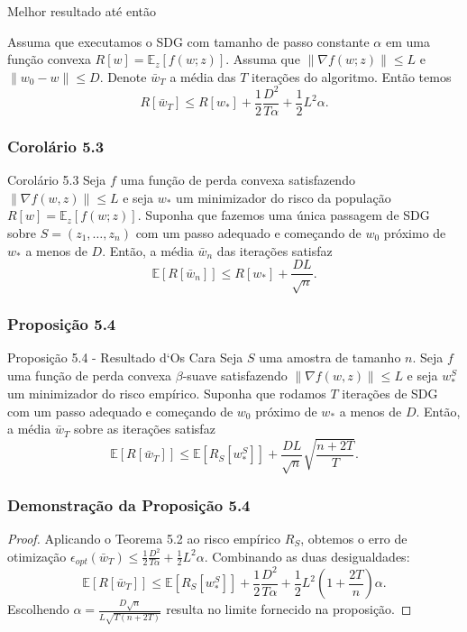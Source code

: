 \documentclass{beamer}
\newcommand{\EE}{\mathbb{E}}
\begin{document}
\begin{frame}{Melhor resultado até então}
\begin{theorem}
Assuma que executamos o SDG com tamanho de passo constante \(\alpha\) em uma função convexa \(R[w]=\EE_z[f(w;z)]\).
Assuma que $\|\nabla f(w;z)\|\le L$ e $\|w_0 - w\| \le D$. Denote $\bar{w}_T$ a média das $T$ iterações do algoritmo.
Então temos
$$ R[\bar{w}_T] \le R[w_*] + \frac{1}{2}\frac{D^2}{T\alpha} + \frac{1}{2}L^2\alpha. $$ 
\end{theorem}
\end{frame}

\begin{frame}
\frametitle{Corolário 5.3}
\begin{block}{Corolário 5.3}
Seja $f$ uma função de perda convexa satisfazendo \(\|\nabla f(w,z)\| \le L\) e seja \(w_*\) um minimizador do risco da população \(R[w] = \EE_z[ f(w;z)]\). Suponha que fazemos uma única passagem de SDG sobre $S=(z_1,\ldots,z_n)$ com um passo adequado e começando de $w_0$ próximo de $w_*$ a menos de $D$.
Então, a média \(\bar{w}_n\) das iterações satisfaz
$$ \EE[R[\bar{w}_n]] \le R[w_*] + \frac{DL}{\sqrt{n}}. $$ 
\end{block}
\end{frame}

\begin{frame}
\frametitle{Proposição 5.4}
\begin{block}{Proposição 5.4 - Resultado d`Os Cara}
Seja $S$ uma amostra de tamanho $n$. Seja $f$ uma função de perda convexa \(\beta\)-suave satisfazendo \(\|\nabla f(w,z)\| \le L\) e seja \(w_*^S\) um minimizador do risco empírico.  
Suponha que rodamos $T$ iterações de SDG com um passo adequado e começando de $w_0$ próximo de $w_*$ a menos de $D$.
Então, a média \(\bar{w}_T\) sobre as iterações satisfaz
$$ \EE[R[\bar{w}_T]] \le \EE[R_S[w_*^S]] + \frac{DL}{\sqrt{n}}\sqrt{\frac{n+2T}{T}}. $$ 
\end{block}
\end{frame}

\begin{frame}
\frametitle{Demonstração da Proposição 5.4}
\begin{proof}
Aplicando o Teorema 5.2 ao risco empírico \(R_S\), obtemos o erro de otimização \(\epsilon_{opt}(\bar{w}_T) \le \frac{1}{2}\frac{D^2}{T\alpha} + \frac{1}{2}L^2\alpha\).  Combinando as duas desigualdades:
$$ \EE[R[\bar{w}_T]] \le \EE[R_S[w_*^S]] + \frac{1}{2}\frac{D^2}{T\alpha} + \frac{1}{2}L^2(1+\frac{2T}{n})\alpha. $$ 
Escolhendo \(\alpha = \frac{D\sqrt{n}}{L\sqrt{T(n+2T)}}\) resulta no limite fornecido na proposição. 
\end{proof}
\end{frame}
\end{document}
